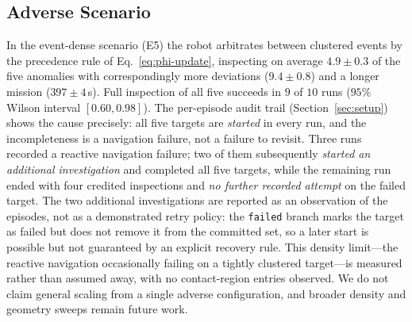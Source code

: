 \subsection{Adverse Scenario}
\label{sec:adverse}
In the event-dense scenario (E5) the robot arbitrates between clustered events by
the precedence rule of Eq.~\eqref{eq:phi-update}, inspecting on average
$4.9\pm0.3$ of the five anomalies with correspondingly more deviations
($9.4\pm0.8$) and a longer mission ($397\pm4$\,s). Full inspection of all five
succeeds in $9$ of $10$ runs ($95\%$ Wilson interval $[0.60,0.98]$). The
per-episode audit trail (Section~\ref{sec:setup}) shows the cause precisely: all
five targets are \emph{started} in every run, and the incompleteness is a
navigation failure, not a failure to revisit. Three runs recorded a reactive
navigation failure; two of them subsequently \emph{started an additional
investigation} and completed all five targets, while the remaining run ended with
four credited inspections and \emph{no further recorded attempt} on the failed
target. The two additional investigations are reported as an observation of the
episodes, not as a demonstrated retry policy: the \texttt{failed} branch marks the
target as failed but does not remove it from the committed set, so a later start is
possible but not guaranteed by an explicit recovery rule. This density limit---the
reactive navigation occasionally failing on a tightly clustered target---is
measured rather than assumed away, with no contact-region entries observed. We do not claim general scaling from a single adverse
configuration, and broader density and geometry sweeps remain future work.


